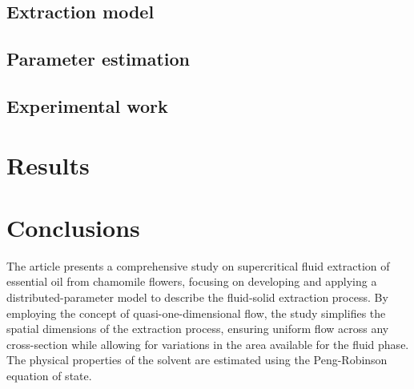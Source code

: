 \documentclass[a4paper,fleqn]{cas-dc}
\begin{document}
\begin{comment}
The low Mach number condition leads to the incompressible condition: $\nabla \cdot u =0$, which is valid for constant density (strict incompressible) or varying density flow. The restraint allows for the removal of acoustic waves, but also allows for large perturbations in density and/or temperature. The assumption is that the flow remains within a Mach number limit (usually less than 0.3) for any solution using such a constraint to be valid. In the 1-D case, the incompressibility condition becomes $\frac{du}{dz} = 0$, so the fluid velocity is constant.

\end{comment}

\subsection{Extraction model} \label{CH: Extraction_model}


\subsection{Parameter estimation} \label{CH: Parameter_estimation}


\subsection{Experimental work}


\section{Results}


\section{Conclusions} \label{CH: Conclusion}

The article presents a comprehensive study on supercritical fluid extraction of essential oil from chamomile flowers, focusing on developing and applying a distributed-parameter model to describe the fluid-solid extraction process. By employing the concept of quasi-one-dimensional flow, the study simplifies the spatial dimensions of the extraction process, ensuring uniform flow across any cross-section while allowing for variations in the area available for the fluid phase. The physical properties of the solvent are estimated using the Peng-Robinson equation of state.
\end{document}
